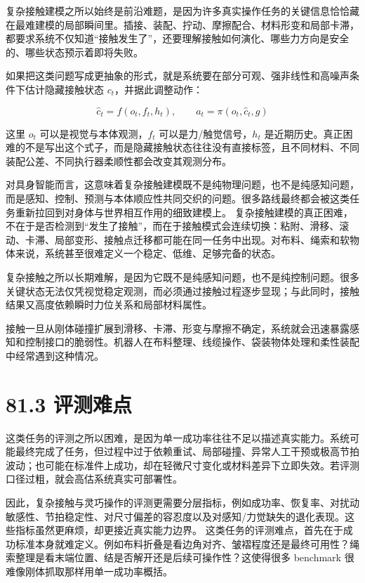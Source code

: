 复杂接触建模之所以始终是前沿难题，是因为许多真实操作任务的关键信息恰恰藏在最难建模的局部瞬间里。插接、装配、拧动、摩擦配合、材料形变和局部卡滞，都要求系统不仅知道“接触发生了”，还要理解接触如何演化、哪些力方向是安全的、哪些状态预示着即将失败。

如果把这类问题写成更抽象的形式，就是系统要在部分可观、强非线性和高噪声条件下估计隐藏接触状态 \(c_t\)，并据此调整动作：

\begingroup
\footnotesize
\begin{equation*}
\hat{c}_t = f(o_t, f_t, h_t), \qquad a_t = \pi(o_t, \hat{c}_t, g)
\end{equation*}
\endgroup

这里 \(o_t\) 可以是视觉与本体观测，\(f_t\) 可以是力/触觉信号，\(h_t\) 是近期历史。真正困难的不是写出这个式子，而是隐藏接触状态往往没有直接标签，且不同材料、不同装配公差、不同执行器柔顺性都会改变其观测分布。

对具身智能而言，这意味着复杂接触建模既不是纯物理问题，也不是纯感知问题，而是感知、控制、预测与本体顺应性共同交织的问题。很多路线最终都会被这类任务重新拉回到对身体与世界相互作用的细致建模上。 复杂接触建模的真正困难，不在于是否检测到“发生了接触”，而在于接触模式会连续切换：粘附、滑移、滚动、卡滞、局部变形、接触点迁移都可能在同一任务中出现。对布料、绳索和软物体来说，系统甚至很难定义一个稳定、低维、足够完备的状态。

复杂接触之所以长期难解，是因为它既不是纯感知问题，也不是纯控制问题。很多关键状态无法仅凭视觉稳定观测，而必须通过接触过程逐步显现；与此同时，接触结果又高度依赖瞬时力位关系和局部材料属性。

接触一旦从刚体碰撞扩展到滑移、卡滞、形变与摩擦不确定，系统就会迅速暴露感知和控制接口的脆弱性。机器人在布料整理、线缆操作、袋装物体处理和柔性装配中经常遇到这种情况。

\section*{81.3 评测难点}


这类任务的评测之所以困难，是因为单一成功率往往不足以描述真实能力。系统可能最终完成了任务，但过程中过于依赖重试、局部碰撞、异常人工干预或极高节拍波动；也可能在标准件上成功，却在轻微尺寸变化或材料差异下立即失效。若评测口径过粗，就会高估系统真实可部署性。

因此，复杂接触与灵巧操作的评测更需要分层指标，例如成功率、恢复率、对扰动敏感性、节拍稳定性、对尺寸偏差的容忍度以及对感知/力觉缺失的退化表现。这些指标虽然更麻烦，却更接近真实能力边界。 这类任务的评测难点，首先在于成功标准本身就难定义。例如布料折叠是看边角对齐、皱褶程度还是最终可用性？绳索整理是看末端位置、结是否解开还是后续可操作性？这使得很多 benchmark 很难像刚体抓取那样用单一成功率概括。


